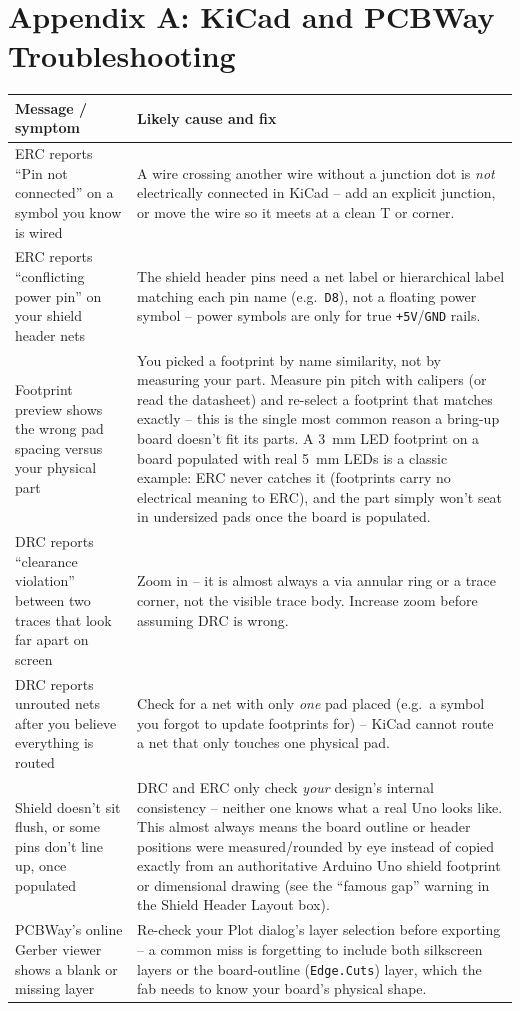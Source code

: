 \documentclass[11pt]{article}
\begin{document}
\newpage
\section*{Appendix A: KiCad and PCBWay Troubleshooting}

\begin{center}
\begin{tabular}{@{}p{5.4cm}p{6.8cm}@{}}
\toprule
\textbf{Message / symptom} & \textbf{Likely cause and fix} \\
\midrule
ERC reports ``Pin not connected'' on a symbol you know is wired &
A wire crossing another wire without a junction dot is \emph{not} electrically
connected in KiCad -- add an explicit junction, or move the wire so it meets at a
clean T or corner. \\
\addlinespace
ERC reports ``conflicting power pin'' on your shield header nets &
The shield header pins need a net label or hierarchical label matching each pin
name (e.g.\ \texttt{D8}), not a floating power symbol -- power symbols are only for
true \texttt{+5V}/\texttt{GND} rails. \\
\addlinespace
Footprint preview shows the wrong pad spacing versus your physical part &
You picked a footprint by name similarity, not by measuring your part. Measure pin
pitch with calipers (or read the datasheet) and re-select a footprint that matches
exactly -- this is the single most common reason a bring-up board doesn't fit its
parts. A 3~mm LED footprint on a board populated with real 5~mm LEDs is a classic
example: ERC never catches it (footprints carry no electrical meaning to ERC),
and the part simply won't seat in undersized pads once the board is populated. \\
\addlinespace
DRC reports ``clearance violation'' between two traces that look far apart on
screen &
Zoom in -- it is almost always a via annular ring or a trace corner, not the visible
trace body. Increase zoom before assuming DRC is wrong. \\
\addlinespace
DRC reports unrouted nets after you believe everything is routed &
Check for a net with only \emph{one} pad placed (e.g.\ a symbol you forgot to update
footprints for) -- KiCad cannot route a net that only touches one physical pad. \\
\addlinespace
Shield doesn't sit flush, or some pins don't line up, once populated &
DRC and ERC only check \emph{your} design's internal consistency -- neither one
knows what a real Uno looks like. This almost always means the board outline or
header positions were measured/rounded by eye instead of copied exactly from an
authoritative Arduino Uno shield footprint or dimensional drawing (see the
``famous gap'' warning in the Shield Header Layout box). \\
\addlinespace
PCBWay's online Gerber viewer shows a blank or missing layer &
Re-check your Plot dialog's layer selection before exporting -- a common miss is
forgetting to include both silkscreen layers or the board-outline (\texttt{Edge.Cuts})
layer, which the fab needs to know your board's physical shape. \\
\bottomrule
\end{tabular}
\end{center}
\end{document}
